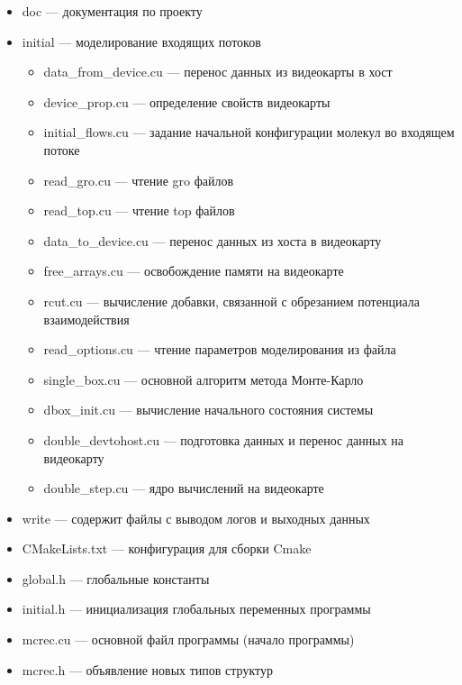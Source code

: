 \begin{itemize}
\begin{itemize}
	\end{itemize}
	\item doc --- документация по проекту
	\item initial --- моделирование входящих потоков
	\begin{itemize}
		\item data\_from\_device.cu --- перенос данных из видеокарты в хост
		\item device\_prop.cu --- определение свойств видеокарты
		\item initial\_flows.cu --- задание начальной конфигурации молекул во входящем потоке
		\item read\_gro.cu  --- чтение gro файлов
		\item read\_top.cu --- чтение top файлов
		\item data\_to\_device.cu 	--- перенос данных из хоста в видеокарту
		\item free\_arrays.cu --- освобождение памяти на видеокарте
		\item rcut.cu --- вычисление добавки, связанной с обрезанием потенциала взаимодействия
		\item read\_options.cu --- чтение параметров моделирования из файла 
		\item single\_box.cu --- основной алгоритм метода Монте-Карло
	\end{itemize}
	\begin{itemize}
		\item dbox\_init.cu --- вычисление начального состояния системы
		\item double\_devtohost.cu --- подготовка данных и перенос данных на видеокарту
		\item double\_step.cu --- ядро вычислений на видеокарте
	\end{itemize}
	\item write --- содержит файлы с выводом логов и выходных данных
	\item CMakeLists.txt --- конфигурация для сборки Cmake
	\item global.h --- глобальные константы
	\item initial.h --- инициализация глобальных переменных программы
	\item mcrec.cu --- основной файл программы (начало программы)
	\item mcrec.h --- объявление новых типов структур
		
\end{itemize}
